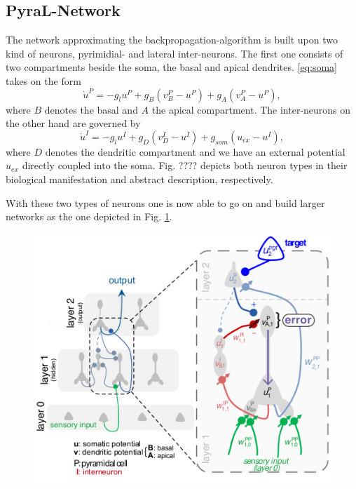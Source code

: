 \documentclass[12pt,a4paper]{article}
\begin{document}
\subsection{PyraL-Network }
The network approximating the backpropagation-algorithm is built upon two kind of neurons, pyrimidial- and lateral inter-neurons. The first one consists of two compartments beside the soma, the basal and apical dendrites. \eqref{eq:soma} takes on the form
\begin{equation}
\dot{u}^P = -g_lu^P + g_B(v^P_B - u^P) + g_A(v^P_A - u^P), 
\end{equation}
where $B$ denotes the basal and $A$ the apical compartment.
The inter-neurons on the other hand are governed by
\begin{equation}
\dot{u}^I = -g_lu^I + g_D(v^I_D - u^I) + g_{som}(u_{ex} - u^I),
\end{equation}
where $D$ denotes the dendritic compartment and we have an external potential $u_{ex}$ directly coupled into the soma. Fig. ???? depicts both neuron types in their biological manifestation and abstract description, respectively.

With these two types of neurons one is now able to go on and build larger networks as the one depicted in Fig. \ref{fig:network}.

\begin{figure}[!ht]
  \centering
  \includegraphics[height=0.6\linewidth]{img/network.png}
  \label{fig:network}
\end{figure}
\end{document}
